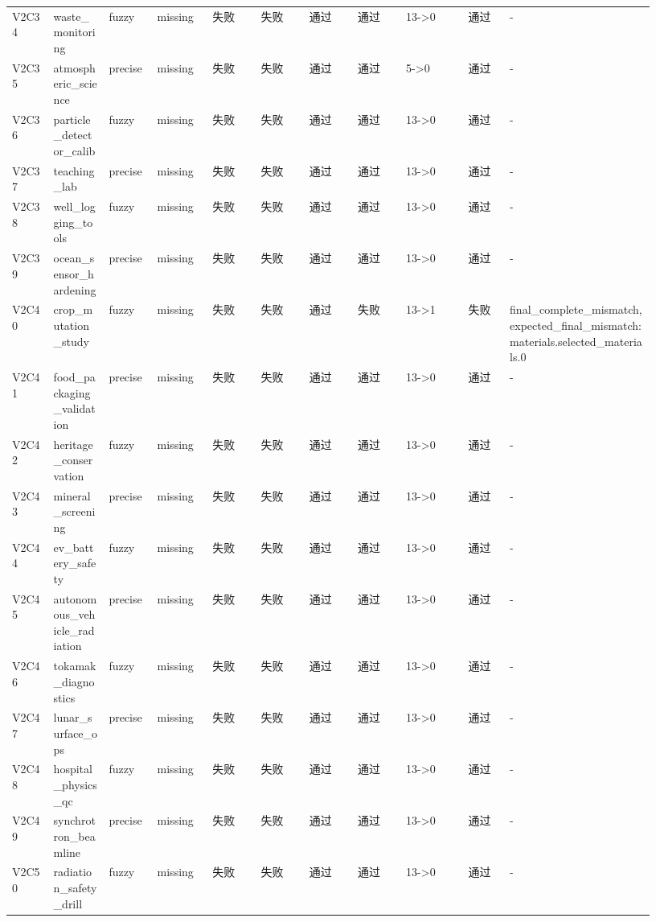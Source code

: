 \documentclass[11pt]{ctexart}
\begin{document}
\begin{longtable}{p{0.06\linewidth}p{0.08\linewidth}p{0.07\linewidth}p{0.08\linewidth}p{0.07\linewidth}p{0.07\linewidth}p{0.07\linewidth}p{0.07\linewidth}p{0.09\linewidth}p{0.06\linewidth}p{0.21\linewidth}}
V2C34 & waste\_monitoring & fuzzy & missing & 失败 & 失败 & 通过 & 通过 & 13->0 & 通过 & - \\
V2C35 & atmospheric\_science & precise & missing & 失败 & 失败 & 通过 & 通过 & 5->0 & 通过 & - \\
V2C36 & particle\_detector\_calib & fuzzy & missing & 失败 & 失败 & 通过 & 通过 & 13->0 & 通过 & - \\
V2C37 & teaching\_lab & precise & missing & 失败 & 失败 & 通过 & 通过 & 13->0 & 通过 & - \\
V2C38 & well\_logging\_tools & fuzzy & missing & 失败 & 失败 & 通过 & 通过 & 13->0 & 通过 & - \\
V2C39 & ocean\_sensor\_hardening & precise & missing & 失败 & 失败 & 通过 & 通过 & 13->0 & 通过 & - \\
V2C40 & crop\_mutation\_study & fuzzy & missing & 失败 & 失败 & 通过 & 失败 & 13->1 & 失败 & final\_complete\_mismatch, expected\_final\_mismatch:materials.selected\_materials.0 \\
V2C41 & food\_packaging\_validation & precise & missing & 失败 & 失败 & 通过 & 通过 & 13->0 & 通过 & - \\
V2C42 & heritage\_conservation & fuzzy & missing & 失败 & 失败 & 通过 & 通过 & 13->0 & 通过 & - \\
V2C43 & mineral\_screening & precise & missing & 失败 & 失败 & 通过 & 通过 & 13->0 & 通过 & - \\
V2C44 & ev\_battery\_safety & fuzzy & missing & 失败 & 失败 & 通过 & 通过 & 13->0 & 通过 & - \\
V2C45 & autonomous\_vehicle\_radiation & precise & missing & 失败 & 失败 & 通过 & 通过 & 13->0 & 通过 & - \\
V2C46 & tokamak\_diagnostics & fuzzy & missing & 失败 & 失败 & 通过 & 通过 & 13->0 & 通过 & - \\
V2C47 & lunar\_surface\_ops & precise & missing & 失败 & 失败 & 通过 & 通过 & 13->0 & 通过 & - \\
V2C48 & hospital\_physics\_qc & fuzzy & missing & 失败 & 失败 & 通过 & 通过 & 13->0 & 通过 & - \\
V2C49 & synchrotron\_beamline & precise & missing & 失败 & 失败 & 通过 & 通过 & 13->0 & 通过 & - \\
V2C50 & radiation\_safety\_drill & fuzzy & missing & 失败 & 失败 & 通过 & 通过 & 13->0 & 通过 & - \\
\bottomrule
\end{longtable}
\end{document}
